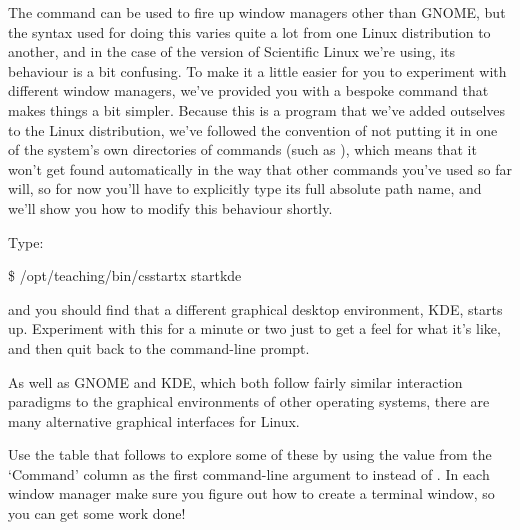 The  command can be used to fire up window managers other than GNOME, but the syntax used for doing this varies quite a lot from one Linux distribution to another, and in the case of the version of Scientific Linux we're using, its behaviour is a bit confusing. To make it a little easier for you to experiment with different window managers, we've provided you with a bespoke command  that makes things a bit simpler. Because this is a program that we've added outselves to the Linux distribution, we've followed the convention of not putting it in one of the system's own directories of commands (such as ), which means that it won't get found automatically in the way that other commands you've used so far will, so for now you'll have to explicitly type its full absolute path name, and we'll show you how to modify this behaviour shortly.

Type:

\begin{ttoutenv}
\$ /opt/teaching/bin/csstartx startkde
\end{ttoutenv}

and you should find that a different graphical desktop environment, KDE, starts up. Experiment with this for a minute or two just to get a feel for what it's like, and then quit back to the command-line prompt.

As well as GNOME and KDE, which both follow fairly similar interaction paradigms to the graphical environments of other operating systems, there are many alternative graphical interfaces for Linux.

Use the table that follows to explore some of these  by using the value from the `Command' column as the first command-line argument to  instead of . In each window manager make sure you figure out how to create a terminal window, so you can get some work done!


